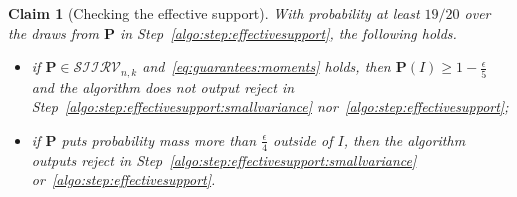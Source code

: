 \documentclass[11pt]{article}
\newtheorem{claim}[theorem]{Claim}
\theoremstyle{definition}
\newcommand{\p}{\mathbf{P}}
\newcommand{\eps}{\epsilon}
\newcommand{\reject}{\textsf{reject}\xspace}
\newcommand{\classksiirv}[2][n]{\ensuremath{\mathcal{SIIRV}_{#1,#2}}\xspace}
\begin{document}
\begin{claim}[Checking the effective support]\label{claim:estimate:effectivesupport}
  With probability at least $19/20$ over the draws from $\p$ in Step~\ref{algo:step:effectivesupport}, the following holds.
  \begin{itemize}
    \item if $\p\in\classksiirv[n]{k}$ and~\eqref{eq:guarantees:moments} holds, then $\p(I)\geq 1-\frac{\eps}{5}$ and the algorithm does not output \reject in Step~\ref{algo:step:effectivesupport:smallvariance} nor~\ref{algo:step:effectivesupport};
    \item if $\p$ puts probability mass more than $\frac{\eps}{4}$ outside of $I$, then the algorithm outputs \reject in Step~\ref{algo:step:effectivesupport:smallvariance} or~\ref{algo:step:effectivesupport}.
  \end{itemize}
\end{claim}
\end{document}
